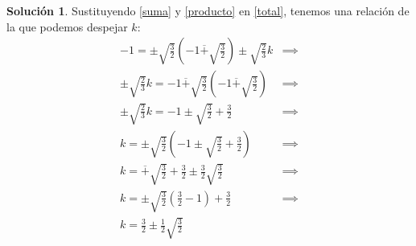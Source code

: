 \documentclass[a4paper, 11pt]{article}
\theoremstyle{definition}
\newtheorem*{solucion}{Solución}
\theoremstyle{remark}
\begin{document}
\begin{solucion}
      Sustituyendo \ref{suma} y \ref{producto} en \ref{total}, tenemos una relación de la que podemos despejar $k$:
      \begin{align*}
          -1 = \pm\sqrt{\frac{3}{2}}(-1\overline{+}\sqrt{\frac{3}{2}})\pm\sqrt{\frac{2}{3}}k &\implies \\
          \pm\sqrt{\frac{2}{3}}k = -1 \overline{+}\sqrt{\frac{3}{2}}(-1\overline{+}\sqrt{\frac{3}{2}}) &\implies \\
          \pm\sqrt{\frac{2}{3}}k = -1 \pm\sqrt{\frac{3}{2}} + \frac{3}{2} &\implies \\
          k = \pm\sqrt{\frac{3}{2}}(-1 \pm\sqrt{\frac{3}{2}} + \frac{3}{2}) &\implies \\
          k = \overline{+}\sqrt{\frac{3}{2}} + \frac{3}{2} \pm\frac{3}{2}\sqrt{\frac{3}{2}} &\implies \\
          k = \pm\sqrt{\frac{3}{2}}(\frac{3}{2}-1) + \frac{3}{2} &\implies \\
          \boxed{k = \frac{3}{2} \pm \frac{1}{2}\sqrt{\frac{3}{2}}} &
      \end{align*}



  \end{solucion}
\end{document}

